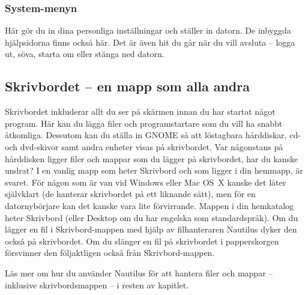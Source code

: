 \documentclass[a4paper,final]{memoir} %
\begin{document}


\subsubsection{System-menyn}


Här gör du in dina personliga inställningar och ställer in datorn. De inbyggda hjälpsidorna finns också här. Det är även hit du går när du vill avsluta -- logga ut, söva, starta om eller stänga ned datorn.



\subsection{Skrivbordet -- en mapp som alla andra}


Skrivbordet inkluderar allt du ser på skärmen innan du har startat något program. Här kan du lägga filer och programstartare som du vill ha snabbt åtkomliga. Dessutom kan du ställa in GNOME så att löstagbara hårddiskar, cd- och dvd-skivor samt andra enheter visas på skrivbordet. Var någonstans på hårddisken ligger filer och mappar som du lägger på skrivbordet, har du kanske undrat? I en vanlig mapp som heter Skrivbord och som ligger i din hemmapp, är svaret. För någon som är van vid Windows eller Mac OS~X kanske det låter självklart (de hanterar skrivbordet på ett liknande sätt), men för en datornybörjare kan det kanske vara lite förvirrande. Mappen i din hemkatalog heter Skrivbord (eller Desktop om du har engelska som standardspråk). Om du lägger en fil i Skrivbord-mappen med hjälp av filhanteraren Nautilus dyker den också på skrivbordet. Om du slänger en fil på skrivbordet i papperskorgen försvinner den följaktligen också från Skrivbord-mappen. 

Läs mer om hur du använder Nautilus för att hantera filer och mappar -- inklusive skrivbordsmappen -- i resten av kapitlet.
\end{document}
